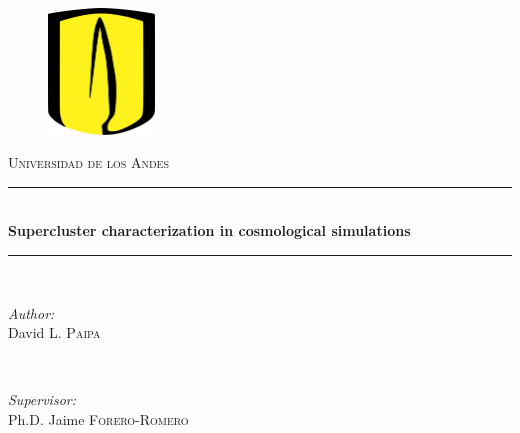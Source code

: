 \usepackage[colorinlistoftodos]{todonotes}
\renewcommand{\baselinestretch}{1.2} 


\begin{titlepage}

\newcommand{\HRule}{\rule{\linewidth}{0.5mm}} %

\center %
 

\begin{figure}[!h]
    \centering
    \includegraphics[width=80pt]{logo.png}
    \label{fig:my_label}
\end{figure}


\textsc{\LARGE Universidad de los Andes}\\[2 cm] %


\HRule \\[0.4cm]
{ \huge \bfseries Supercluster characterization in cosmological simulations}\\[0.4cm] %
\HRule \\[1.5cm]
 

\begin{minipage}{0.4\textwidth}
\begin{flushleft} \large
\emph{Author:}\\
David L. \textsc{Paipa} %
\end{flushleft}
\end{minipage}
~
\begin{minipage}{0.4\textwidth}
\begin{flushright} \large
\emph{Supervisor:} \\
Ph.D. Jaime \textsc{Forero-Romero} %
\end{flushright}
\end{minipage}\\[2cm]


\end{titlepage}
